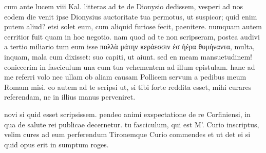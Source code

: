 


 cum ante lucem viii Kal. litteras ad te de Dionysio dedissem, vesperi ad nos eodem die venit ipse Dionysius auctoritate tua permotus, ut suspicor; quid enim putem aliud? etsi solet eum, cum aliquid furiose fecit, paenitere. numquam autem cerritior fuit quam in hoc negotio. nam quod ad te non scripseram, postea audivi a tertio miliario tum eum isse πολλὰ μάτην κεράεσσιν ἐσ ἠέρα θυμήναντα, multa, inquam, mala cum dixisset: suo capiti, ut aiunt. sed en meam mansuetudinem! coniecerim in fasciculum una cum tua vehementem ad illum epistulam. hanc ad me referri volo nec ullam ob aliam causam Pollicem servum a pedibus meum Romam misi. eo autem ad te scripsi ut, si tibi forte reddita esset, mihi curares referendam, ne in illius manus perveniret.

 novi si quid esset scripsissem. pendeo animi exspectatione de re Corfiniensi, in qua de salute rei publicae decernetur. tu fasciculum, qui est M'. Curio inscriptus, velim cures ad eum perferendum Tironemque Curio commendes et ut det ei si quid opus erit in sumptum roges.

